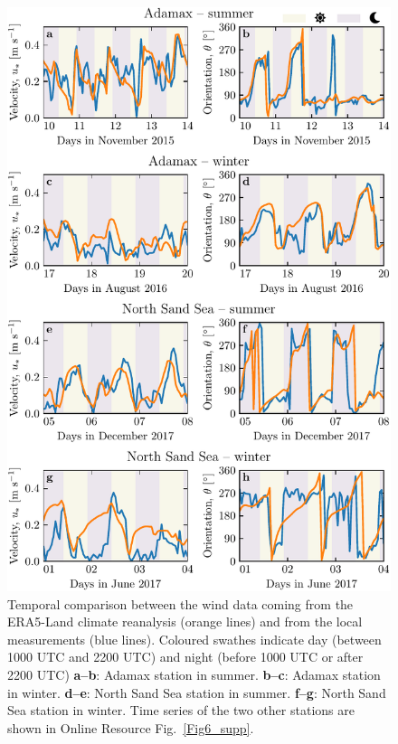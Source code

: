 \begin{figure}
\centering
\includegraphics[scale=1]{Figures/Figure2.pdf}
\caption{Temporal comparison between the wind data coming from the ERA5-Land climate reanalysis (orange lines) and from the local measurements (blue lines). Coloured swathes indicate day (between 1000 UTC and 2200 UTC) and night (before 1000 UTC or after 2200 UTC) \textbf{a--b}: Adamax station in summer. \textbf{b--c}: Adamax station in winter. \textbf{d--e}: North Sand Sea station in summer. \textbf{f--g}: North Sand Sea station in winter. Time series of the two other stations are shown in Online Resource Fig.~\ref{Fig6_supp}.}
\label{Fig2}
\end{figure}


